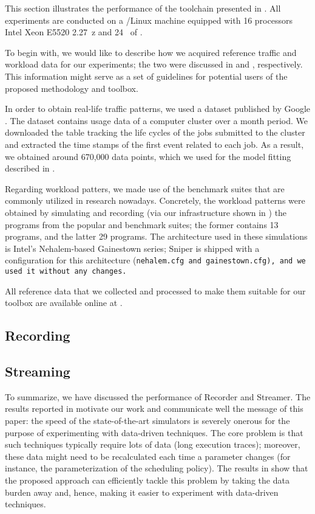 This section illustrates the performance of the toolchain presented in
. All experiments are conducted on a /Linux machine
equipped with 16 processors Intel Xeon E5520 2.27~z and 24~ of
.

To begin with, we would like to describe how we acquired reference traffic and
workload data for our experiments; the two were discussed in  and
, respectively. This information might serve as a set of
guidelines for potential users of the proposed methodology and toolbox.

In order to obtain real-life traffic patterns, we used a dataset published by
Google \cite{google}. The dataset contains usage data of a computer cluster over
a month period. We downloaded the table tracking the life cycles of the jobs
submitted to the cluster and extracted the time stamps of the first event
related to each job. As a result, we obtained around 670,000 data points, which
we used for the model fitting described in .

Regarding workload patters, we made use of the benchmark suites that are
commonly utilized in research nowadays. Concretely, the workload patterns were
obtained by simulating and recording (via our infrastructure shown in
) the programs from the popular  \cite{bienia2011} and
 \cite{cpu2006} benchmark suites; the former contains 13
programs, and the latter 29 programs. The architecture used in these simulations
is Intel's Nehalem-based Gainestown series; Sniper is shipped with a
configuration for this architecture (\tt{nehalem.cfg} and \tt{gainestown.cfg}),
and we used it without any changes.

All reference data that we collected and processed to make them suitable for our
toolbox are available online at \cite{sources}.

\subsection{Recording}


\subsection{Streaming}


To summarize, we have discussed the performance of Recorder and Streamer. The
results reported in  motivate our work and communicate well the
message of this paper: the speed of the state-of-the-art simulators is severely
onerous for the purpose of experimenting with data-driven techniques. The core
problem is that such techniques typically require lots of data (long execution
traces); moreover, these data might need to be recalculated each time a
parameter changes (for instance, the parameterization of the scheduling policy).
The results in  show that the proposed approach can efficiently
tackle this problem by taking the data burden away and, hence, making it easier
to experiment with data-driven techniques.
